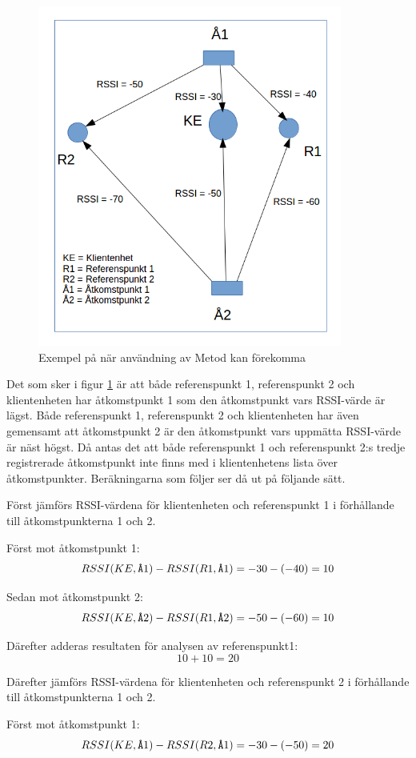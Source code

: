 \documentclass[swedish, a4paper,12pt]{article}
\begin{document}
\begin{figure}[H]
  \centering
  \includegraphics[width=10cm]{media/MET2.png}
  \caption{Exempel på när användning av Metod kan förekomma}
  \label{fig:MET2}
\end{figure}

Det som sker i figur \ref{fig:MET2} är att både referenspunkt 1, referenspunkt 2 och klientenheten har åtkomstpunkt 1 som den åtkomstpunkt vars RSSI-värde är lägst. Både referenspunkt 1, referenspunkt 2 och klientenheten har även gemensamt att åtkomstpunkt 2 är den åtkomstpunkt vars uppmätta RSSI-värde är näst högst. Då antas det att både referenspunkt 1 och referenspunkt 2:s tredje registrerade åtkomstpunkt inte finns med i klientenhetens lista över åtkomstpunkter. Beräkningarna som följer ser då ut på följande sätt.

Först jämförs RSSI-värdena för klientenheten och referenspunkt 1 i förhållande till åtkomstpunkterna 1 och 2.

Först mot åtkomstpunkt 1: $$ RSSI (KE,\verb|Å|1)  -  RSSI (R1,\verb|Å|1) = -30 - (- 40) = 10 $$

Sedan mot åtkomstpunkt 2: $$ RSSI (KE,\verb|Å|2)  -  RSSI (R1,\verb|Å|2) = -50 - (- 60) = 10 $$

Därefter adderas resultaten för analysen av referenspunkt1: $$ 10 + 10 = 20$$

Därefter jämförs RSSI-värdena för klientenheten och referenspunkt 2 i förhållande till åtkomstpunkterna 1 och 2.

Först mot åtkomstpunkt 1: $$ RSSI (KE,\verb|Å|1)  -  RSSI (R2,\verb|Å|1) = -30 - (- 50) = 20 $$
\end{document}
